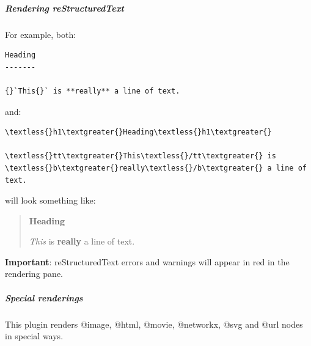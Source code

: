 \documentclass[a4paper,10pt,english]{sphinxmanual}
\begin{document}
\subparagraph{Rendering reStructuredText}
\label{what-is-new:rendering-restructuredtext}
For example, both:

\begin{Verbatim}[commandchars=\\\{\}]
Heading
-------

{}`This{}` is **really** a line of text.
\end{Verbatim}

and:

\begin{Verbatim}[commandchars=\\\{\}]
\textless{}h1\textgreater{}Heading\textless{}h1\textgreater{}

\textless{}tt\textgreater{}This\textless{}/tt\textgreater{} is \textless{}b\textgreater{}really\textless{}/b\textgreater{} a line of text.
\end{Verbatim}

will look something like:
\begin{quote}

\textbf{Heading}

\emph{This} is \textbf{really} a line of text.
\end{quote}

\textbf{Important}: reStructuredText errors and warnings will appear in red in the rendering pane.


\subparagraph{Special renderings}
\label{what-is-new:special-renderings}
This plugin renders @image, @html, @movie, @networkx, @svg and @url nodes in
special ways.
\end{document}
